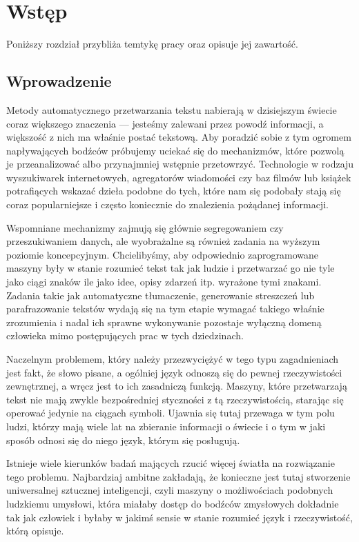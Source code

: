\documentclass[11pt,a4paper]{article}
\begin{document}
\section{Wstęp}

Poniższy rozdział przybliża temtykę pracy oraz opisuje jej zawartość.

\subsection{Wprowadzenie}

Metody automatycznego przetwarzania tekstu nabierają w dzisiejszym świecie
coraz większego znaczenia --- jesteśmy zalewani przez powodź informacji, a
większość z nich ma właśnie postać tekstową. Aby poradzić sobie z tym ogromem
napływających bodźców próbujemy uciekać się do mechanizmów, które pozwolą je
przeanalizować albo przynajmniej wstępnie przetowrzyć. Technologie w rodzaju
wyszukiwarek internetowych, agregatorów wiadomości czy baz filmów lub książek
potrafiących wskazać dzieła podobne do tych, które nam się podobały stają się
coraz popularniejsze i często koniecznie do znalezienia pożądanej informacji.

Wspomniane mechanizmy zajmują się głównie segregowaniem czy przeszukiwaniem
danych, ale wyobrażalne są również zadania na wyższym poziomie koncepcyjnym.
Chcielibyśmy, aby odpowiednio zaprogramowane maszyny były w stanie rozumieć
tekst tak jak ludzie i przetwarzać go nie tyle jako ciągi znaków ile jako idee,
opisy zdarzeń itp. wyrażone tymi znakami. Zadania takie jak automatyczne
tłumaczenie, generowanie streszczeń lub parafrazowanie tekstów wydają się na
tym etapie wymagać takiego właśnie zrozumienia i nadal ich sprawne wykonywanie
pozostaje wyłączną domeną człowieka mimo postępujących prac w tych
dziedzinach.

Naczelnym problemem, który należy przezwyciężyć w tego typu zagadnieniach jest
fakt, że słowo pisane, a ogólniej język odnoszą się do pewnej rzeczywistości
zewnętrznej, a wręcz jest to ich zasadniczą funkcją. Maszyny, które
przetwarzają tekst nie mają zwykle bezpośredniej styczności z tą
rzeczywistością, starając się operować jedynie na ciągach symboli. Ujawnia się
tutaj przewaga w tym polu ludzi, którzy mają wiele lat na zbieranie informacji
o świecie i o tym w jaki sposób odnosi się do niego język, którym się
posługują.

Istnieje wiele kierunków badań mających rzucić więcej światła na rozwiązanie
tego problemu. Najbardziaj ambitne zakładają, że konieczne jest tutaj
stworzenie uniwersalnej sztucznej inteligencji, czyli maszyny o możliwościach
podobnych ludzkiemu umysłowi, która miałaby dostęp do bodźców zmysłowych
dokładnie tak jak człowiek i byłaby w jakimś sensie w stanie rozumieć
język i rzeczywistość, którą opisuje.
\end{document}
